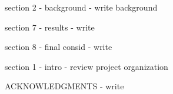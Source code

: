 section 2 - background
- write background

section 7 - results
- write

section 8 - final consid
- write

section 1 - intro
- review project organization

ACKNOWLEDGMENTS
- write
